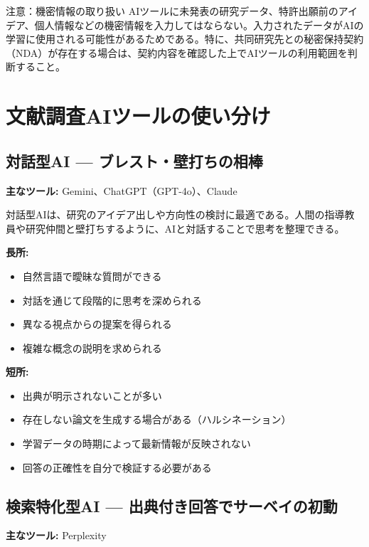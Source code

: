 \begin{itembox}[l]{注意：機密情報の取り扱い}
AIツールに未発表の研究データ、特許出願前のアイデア、個人情報などの機密情報を入力してはならない。入力されたデータがAIの学習に使用される可能性があるためである。特に、共同研究先との秘密保持契約（NDA）が存在する場合は、契約内容を確認した上でAIツールの利用範囲を判断すること。
\end{itembox}

\section{文献調査AIツールの使い分け}
\label{sec:3.2}

\subsection{対話型AI --- ブレスト・壁打ちの相棒}

\textbf{主なツール:} Gemini、ChatGPT（GPT-4o）、Claude

対話型AIは、研究のアイデア出しや方向性の検討に最適である。人間の指導教員や研究仲間と壁打ちするように、AIと対話することで思考を整理できる。

\textbf{長所:}
\begin{itemize}
\item 自然言語で曖昧な質問ができる
\item 対話を通じて段階的に思考を深められる
\item 異なる視点からの提案を得られる
\item 複雑な概念の説明を求められる
\end{itemize}

\textbf{短所:}
\begin{itemize}
\item 出典が明示されないことが多い
\item 存在しない論文を生成する場合がある（ハルシネーション）
\item 学習データの時期によって最新情報が反映されない
\item 回答の正確性を自分で検証する必要がある
\end{itemize}

\subsection{検索特化型AI --- 出典付き回答でサーベイの初動}

\textbf{主なツール:} Perplexity

